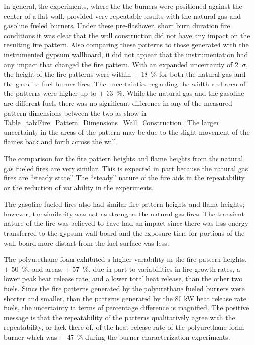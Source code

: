 \documentclass[twoside]{uocthesis}
\begin{document}
{In general, the experiments, where the the burners were positioned against the center of a flat wall, provided very repeatable results with the natural gas and gasoline fueled burners. Under these pre-flashover, short burn duration fire conditions it was clear that the wall construction did not have any impact on the resulting fire pattern.  Also comparing these patterns to those generated with the instrumented gypsum wallboard, it did not appear that the instrumentation had any impact that changed the fire pattern.  With an expanded uncertainty of 2~$\sigma$, the height of the fire patterns were within $\pm$ 18~\% for both the natural gas and the gasoline fuel burner fires.  The uncertainties regarding the width and area of the patterns were higher up to $\pm$ 33~\%.  While the natural gas and the gasoline are different fuels there was no significant difference in any of the measured pattern dimensions between the two as show in Table~\ref{tab:Fire_Pattern_Dimensions_Wall_Construction}.  The larger uncertainty in the areas of the pattern may be due to the slight movement of the flames back and forth across the wall.    

The comparison for the fire pattern heights and flame heights from the natural gas fueled fires are very similar.  This is expected in part because the natural gas fires are “steady state”.  The “steady” nature of the fire aids in the repeatability or the reduction of variability in the experiments.  

The gasoline fueled fires also had similar fire pattern heights and flame heights; however, the similarity was not as strong as the natural gas fires.  The transient nature of the fire was believed to have had an impact since there was less energy transferred to the gypsum wall board and the exposure time for portions of the wall board more distant from the fuel surface was less.  

The polyurethane foam exhibited a higher variability in the fire pattern heights, $\pm$ 50~\%, and areas, $\pm$ 57~\%, due in part to variabilities in fire growth rates, a lower peak heat release rate, and a lower total heat release, than the other two fuels. Since the fire patterns generated by the polyurethane fueled burners were shorter and smaller, than the patterns generated by the 80 kW heat release rate fuels, the uncertainty in terms of percentage difference is magnified.  The positive message is that the repeatability of the patterns qualitatively agree with the repeatability, or lack there of, of the heat release rate of the polyurethane foam burner which was $\pm$ 47~\% during the burner characterization experiments.     

}
\end{document}
